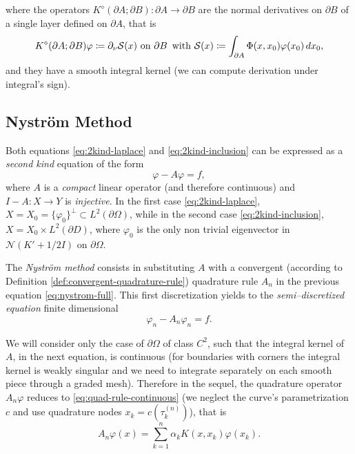 \documentclass[10pt, a4paper, twoside, openright]{book}
\theoremstyle{definition}
\theoremstyle{plain}
\theoremstyle{plain}
\theoremstyle{plain}
\theoremstyle{plain}
\theoremstyle{plain}
\theoremstyle{plain}
\theoremstyle{plain}
\theoremstyle{plain}
\let\phi\varphi
\begin{document}
where the operators $K^\diamond(\partial A;\partial B):\partial A\to\partial B$ are the normal derivatives 
on $\partial B$ of a single layer defined on $\partial A$, that is
\begin{equation}
 K^\diamond(\partial A;\partial B)\phi\coloneqq \partial_\nu \mathcal{S}(x)\textup{ on }\partial B\,\textup{ with }
 \mathcal{S}(x)\coloneqq \int_{\partial A}\Phi(x,x_0)\phi(x_0)\,dx_0,
\end{equation}
and they have a smooth integral kernel (we can compute derivation under integral's sign).
\subsection{Nystr\"om Method}
Both equations \eqref{eq:2kind-laplace} and \eqref{eq:2kind-inclusion} can be expressed as 
a \emph{second kind} equation of the form
\begin{equation}
\label{eq:nystrom-full}
 \phi-A\phi = f,
\end{equation}
where $A$ is a \emph{compact} linear operator (and therefore continuous) and $I-A:X\to Y$ is \emph{injective}. 
In the first case \eqref{eq:2kind-laplace}, $X=X_0=\{\phi_0\}^\perp \subset L^2(\partial \Omega)$, 
while in the second case \eqref{eq:2kind-inclusion}, $X=X_0\times L^2(\partial D)$, where $\phi_0$ is the only non trivial eigenvector in $\mathcal{N}(K' + 1/2I)$ on $\partial\Omega$.
\par
The \emph{Nystr\"om method} consists in substituting $A$ with a convergent (according to Definition \ref{def:convergent-quadrature-rule}) 
quadrature rule $A_n$ in the previous equation \eqref{eq:nystrom-full}. 
This first discretization yields to the \emph{semi--discretized equation} finite dimensional
\begin{equation}
\label{eq:nystrom-semi}
 \phi_n - A_n\phi_n = f.
\end{equation}
\par
We will consider only the case of $\partial \Omega$ of class $C^2$, such that the 
integral kernel of $A$, in the next equation, is continuous 
(for boundaries with corners the integral kernel is weakly singular and we need to integrate separately on each smooth piece through a graded mesh).
Therefore in the sequel, the quadrature operator $A_n\phi$ reduces to \eqref{eq:quad-rule-continuous} 
(we neglect the curve's parametrization $c$ and use quadrature nodes $x_k=c(\tau_k^{(n)})$), that is
\begin{equation}
\label{eq:quad-rule-continuous-synt}
 A_n\phi(x) = \sum_{k=1}^n\alpha_k K(x,x_k)\phi(x_k).
\end{equation}
\end{document}
